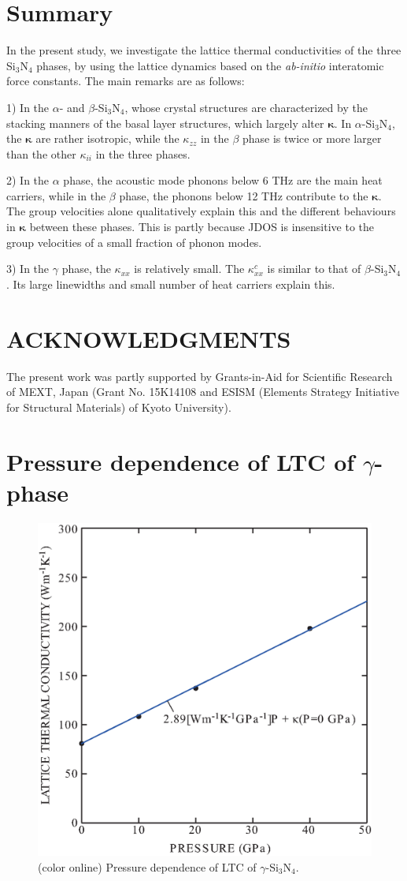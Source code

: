\documentclass[twocolumn,amsmath,amssymb,a4paper,prb,superscriptaddress,floatfix]{revtex4-1}
\begin{document}
\section{Summary}

In the present study, we investigate the lattice thermal conductivities of the
three Si$_3$N$_4$ phases, by using the lattice dynamics based on the {\it
ab-initio} interatomic force constants. The main remarks are as follows:

1) In the $\alpha$- and $\beta$-Si$_3$N$_4$, whose crystal structures are
characterized by the stacking manners of the basal layer structures, which
largely alter $\boldsymbol{\kappa}$. In $\alpha$-Si$_3$N$_4$, the
$\boldsymbol{\kappa}$ are rather isotropic, while the $\kappa$$_{zz}$ in the
$\beta$ phase is twice or more larger than the other $\kappa_{ii}$ in the
three phases.

2) In the $\alpha$ phase, the acoustic mode phonons below 6 THz are the main
heat carriers, while in the $\beta$ phase, the phonons below 12 THz contribute
to the $\boldsymbol{\kappa}$. The group velocities alone qualitatively explain
this and the different behaviours in $\boldsymbol{\kappa}$ between these phases.
This is partly because JDOS is insensitive to the group
velocities of a small fraction of phonon modes.

3) In the $\gamma$ phase, the $\kappa_{xx}$ is relatively small. The
$\kappa^c_{xx}$ is similar to that of $\beta$-Si$_3$N$_4$. Its large linewidths
and small number of heat carriers explain this.

\section*{ACKNOWLEDGMENTS}
The present work was partly supported by Grants-in-Aid for Scientific
Research of MEXT, Japan (Grant No. 15K14108 and ESISM (Elements Strategy
Initiative for Structural Materials) of Kyoto University).

\appendix
\section{Pressure dependence of LTC of $\gamma$-phase}
\begin{figure}[ht]
 \begin{center}
  \includegraphics[width=0.80\linewidth]{S1.eps} \caption{(color online)
  Pressure dependence of LTC of $\gamma$-Si$_3$N$_4$.  \label{fig:S1} }
 \end{center}
\end{figure}

\end{document}
